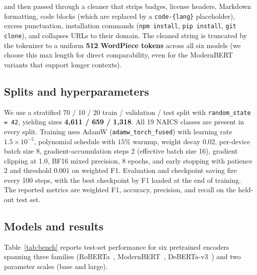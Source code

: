 \documentclass{article}
\begin{document}
\noindent and then passed through a cleaner that strips badges, license
headers, Markdown formatting, code blocks (which are replaced by a
\texttt{code-\{lang\}} placeholder), excess punctuation, installation
commands (\texttt{npm install}, \texttt{pip install},
\texttt{git clone}), and collapses URLs to their domain. The cleaned
string is truncated by the tokenizer to a uniform \textbf{512
WordPiece tokens} across all six models (we choose this max length for
direct comparability, even for the ModernBERT variants that support
longer contexts).

\subsection{Splits and hyperparameters}

We use a stratified 70 / 10 / 20 train / validation / test split with
\texttt{random\_state = 42}, yielding sizes
\textbf{4{,}611 / 659 / 1{,}318}. All 19 NAICS classes are present in
every split. Training uses AdamW
(\texttt{adamw\_torch\_fused}) with learning rate $1.5\times 10^{-5}$,
polynomial schedule with $15\%$ warmup, weight decay $0.02$,
per-device batch size 8, gradient-accumulation steps 2 (effective
batch size 16), gradient clipping at 1.0, BF16 mixed precision, 8
epochs, and early stopping with patience 2 and threshold $0.001$ on
weighted F1. Evaluation and checkpoint saving fire every 100 steps,
with the best checkpoint by F1 loaded at the end of training. The
reported metrics are weighted F1, accuracy, precision, and recall on
the held-out test set.

\subsection{Models and results}

Table~\ref{tab:bench} reports test-set performance for six pretrained
encoders spanning three families
(RoBERTa~\citep{liu2019roberta},
ModernBERT~\citep{warner2024modernbert},
DeBERTa-v3~\citep{he2023debertav3}) and two
parameter scales (base and large).
\end{document}
